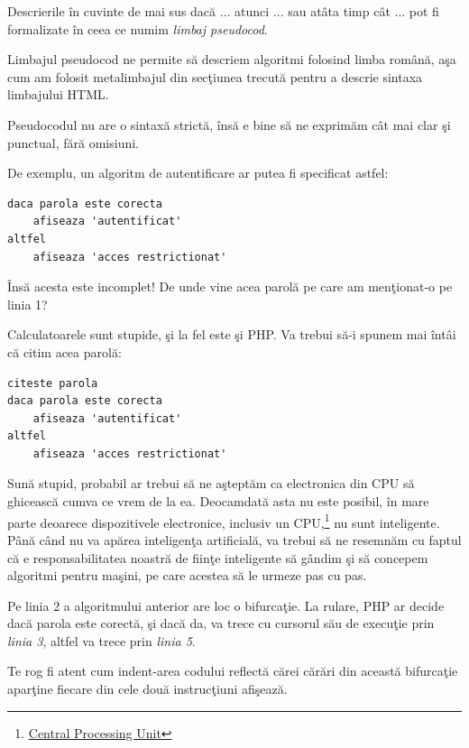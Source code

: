 Descrierile în cuvinte de mai sus {\glqq}dacă ... atunci ...{\grqq}
sau {\glqq}atâta timp cât ...{\grqq} pot fi formalizate în ceea
ce numim \textsl{limbaj pseudocod}. 

Limbajul pseudocod ne permite să descriem algoritmi
folosind limba română, aşa cum am folosit metalimbajul
din secţiunea trecută pentru a descrie sintaxa limbajului HTML.

Pseudocodul nu are o sintaxă strictă, însă e bine să
ne exprimăm cât mai clar şi punctual, fără omisiuni.

De exemplu, un algoritm de autentificare ar putea
fi specificat astfel:
\begin{lstlisting}[language=pseudocod]
daca parola este corecta
	afiseaza 'autentificat'
altfel
	afiseaza 'acces restrictionat'
\end{lstlisting}
Însă acesta este incomplet! De unde vine
acea {\glqq}parolă{\grqq} pe care am menţionat-o pe linia 1?

Calculatoarele sunt stupide, şi la fel este şi PHP. Va
trebui să-i spunem mai întâi că citim acea parolă:
\begin{lstlisting}[language=pseudocod]
citeste parola
daca parola este corecta
	afiseaza 'autentificat'
altfel
	afiseaza 'acces restrictionat'
\end{lstlisting}

Sună stupid, probabil ar trebui să ne aşteptăm
ca electronica din CPU să ghicească cumva
ce vrem de la ea. Deocamdată asta nu este posibil,
în mare parte deoarece dispozitivele electronice,
inclusiv un
CPU,\footnote{\href{http://en.wikipedia.org/wiki/Central_processing_unit}{Central Processing Unit}} nu sunt inteligente.
Până când nu va apărea inteligenţa artificială,
va trebui să ne resemnăm cu faptul că e responsabilitatea
noastră de fiinţe inteligente să gândim şi să
concepem algoritmi pentru maşini, pe care
acestea să le urmeze pas cu pas.

Pe linia 2 a algoritmului anterior are loc o bifurcaţie.
La rulare, PHP ar decide dacă {\glqq}parola este corectă{\grqq}, şi dacă
da, va trece cu cursorul său {\glqq}de execuţie{\grqq} prin \textit{linia 3},
altfel va trece prin \textit{linia 5}. 

Te rog fi atent cum indent-area codului reflectă cărei {\glqq}cărări{\grqq}
din această bifurcaţie aparţine fiecare din cele două instrucţiuni
{\glqq}afişează{\grqq}.

